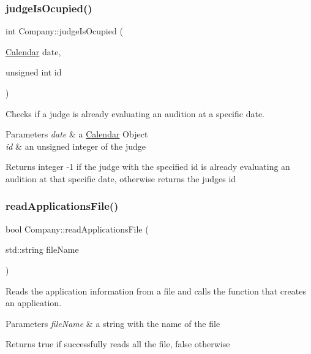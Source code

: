 \subsubsection{\texorpdfstring{judge\+Is\+Ocupied()}{judgeIsOcupied()}}
{\footnotesize\ttfamily int Company\+::judge\+Is\+Ocupied (\begin{DoxyParamCaption}\item[{\hyperlink{class_calendar}{Calendar}}]{date,  }\item[{unsigned int}]{id }\end{DoxyParamCaption})}



Checks if a judge is already evaluating an audition at a specific date. 


\begin{DoxyParams}{Parameters}
{\em date} & a \hyperlink{class_calendar}{Calendar} Object \\
\hline
{\em id} & an unsigned integer of the judge \\
\hline
\end{DoxyParams}
\begin{DoxyReturn}{Returns}
integer -\/1 if the judge with the specified id is already evaluating an audition at that specific date, otherwise returns the judge\textquotesingle{}s id 
\end{DoxyReturn}
\mbox{\label{class_company_a2be6170874e4695402614a5d8f624f9c}} 
\subsubsection{\texorpdfstring{read\+Applications\+File()}{readApplicationsFile()}}
{\footnotesize\ttfamily bool Company\+::read\+Applications\+File (\begin{DoxyParamCaption}\item[{std\+::string}]{file\+Name }\end{DoxyParamCaption})}



Reads the application information from a file and calls the function that creates an application. 


\begin{DoxyParams}{Parameters}
{\em file\+Name} & a string with the name of the file \\
\hline
\end{DoxyParams}
\begin{DoxyReturn}{Returns}
true if successfully reads all the file, false otherwise 
\end{DoxyReturn}
\mbox{\label{class_company_adecfc6079e977e211786571fc348167b}} 
